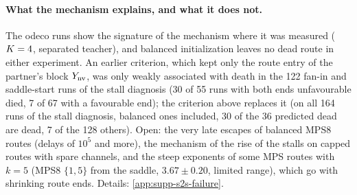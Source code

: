 \paragraph{What the mechanism explains, and what it does not.}
\empirical{} The odeco runs show the signature of the mechanism where it was measured ($K=4$, separated
teacher), and balanced initialization leaves no dead route in either experiment. An earlier criterion, which kept
only the route entry of the partner's block $Y_{\rm nv}$, was only weakly associated with death in the 122 fan-in and
saddle-start runs of the stall diagnosis (30 of 55 runs with both ends unfavourable died, 7 of 67 with a favourable
end); the criterion above replaces it (on all 164 runs of the stall diagnosis, balanced ones included, 30 of the 36
predicted dead are dead, 7 of the 128 others).
Open: the very late escapes of balanced MPS8 routes (delays of $10^5$ and more), the mechanism of the rise of the
stalls on capped routes with spare channels, and the steep exponents of some MPS routes with $k=5$ (MPS8 $\{1,5\}$
from the saddle, $3.67\pm0.20$, limited range), which go with shrinking route ends. Details:
\cref{app:supp-s2s-failure}.
